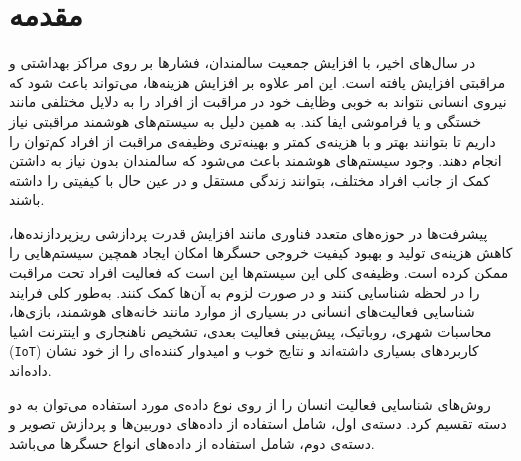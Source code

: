 \chapter{مقدمه}
\clearpage

در سال‌های اخیر، با افزایش جمعیت سالمندان، فشارها بر روی مراکز بهداشتی و مراقبتی افزایش یافته است. این امر علاوه بر افزایش هزینه‌ها، می‌تواند باعث شود که نیروی انسانی نتواند به خوبی وظایف خود در مراقبت از افراد را به دلایل مختلفی مانند خستگی و یا فراموشی ایفا کند. به همین دلیل به سیستم‌های هوشمند مراقبتی نیاز داریم تا بتوانند بهتر و با هزینه‌ی کمتر و بهینه‌تری وظیفه‌ی مراقبت از افراد کم‌توان را انجام دهند. وجود سیستم‌های هوشمند باعث می‌شود که سالمندان بدون نیاز به داشتن کمک از جانب افراد مختلف، بتوانند زندگی مستقل و در عین حال با کیفیتی را داشته باشند.

پیشرفت‌ها در حوزه‌های متعدد فناوری مانند افزایش قدرت پردازشی ریزپردازنده‌ها، کاهش هزینه‌ی تولید و بهبود کیفیت خروجی حسگرها امکان ایجاد همچین سیستم‌هایی را ممکن کرده است. وظیفه‌ی کلی این سیستم‌ها این است که فعالیت افراد تحت مراقبت را در لحظه شناسایی کنند و در صورت لزوم به آن‌ها کمک کنند. به‌طور کلی فرایند شناسایی فعالیت‌های انسانی در بسیاری از موارد مانند خانه‌های هوشمند\cite{alaghbari2022activities,liao2014detecting}،
بازی‌ها\cite{almeida2017activity}،
محاسبات شهری\cite{zambonelli2011pervasive}،
روباتیک\cite{pereyda2019cyber}،
پیش‌بینی فعالیت بعدی\cite{alaghbari2022activities,jaouedi2020prediction}،
تشخیص ناهنجاری\cite{alaghbari2022activities,zhu2015wearable}
و اینترنت اشیا (\verb;IoT;)\cite{lu2018wearable}
کاربردهای بسیاری داشته‌اند و نتایج خوب و امیدوار کننده‌ای را از خود نشان داده‌اند.

روش‌های شناسایی فعالیت انسان
را از روی نوع داده‌ی مورد استفاده می‌توان به دو دسته تقسیم کرد. دسته‌ی اول، شامل استفاده از داده‌های دوربین‌ها و پردازش تصویر و دسته‌ی دوم، شامل استفاده از داده‌های انواع حسگرها می‌باشد.

